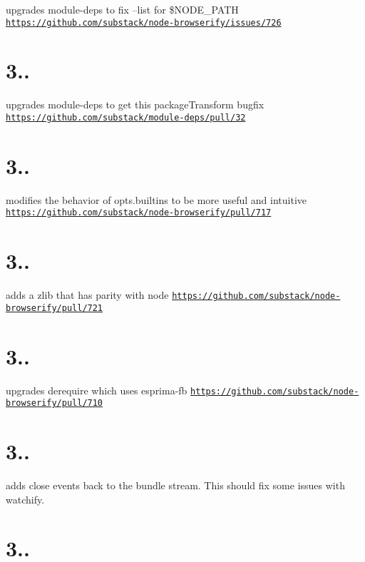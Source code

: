 upgrades module-\/deps to fix --list for \$\+N\+O\+D\+E\+\_\+\+P\+A\+TH \href{https://github.com/substack/node-browserify/issues/726}{\tt https\+://github.\+com/substack/node-\/browserify/issues/726}

\section*{3..}

upgrades module-\/deps to get this package\+Transform bugfix \href{https://github.com/substack/module-deps/pull/32}{\tt https\+://github.\+com/substack/module-\/deps/pull/32}

\section*{3..}

modifies the behavior of opts.\+builtins to be more useful and intuitive \href{https://github.com/substack/node-browserify/pull/717}{\tt https\+://github.\+com/substack/node-\/browserify/pull/717}

\section*{3..}

adds a zlib that has parity with node \href{https://github.com/substack/node-browserify/pull/721}{\tt https\+://github.\+com/substack/node-\/browserify/pull/721}

\section*{3..}

upgrades derequire which uses esprima-\/fb \href{https://github.com/substack/node-browserify/pull/710}{\tt https\+://github.\+com/substack/node-\/browserify/pull/710}

\section*{3..}

adds \textquotesingle{}close\textquotesingle{} events back to the bundle stream. This should fix some issues with watchify.

\section*{3..}

